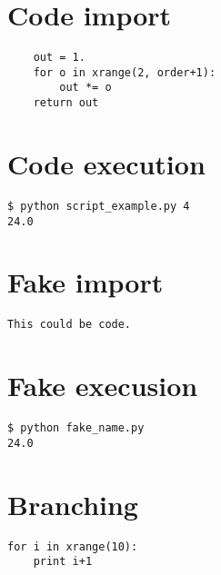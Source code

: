 \documentclass{article}
\begin{document}
\section*{Code import}

\begin{Verbatim}
    out = 1.
    for o in xrange(2, order+1):
        out *= o
    return out
\end{Verbatim}

\section*{Code execution}

\vspace{4pt}
\begin{Verbatim}
$ python script_example.py 4
24.0
\end{Verbatim}
\noindent

\section*{Fake import}

\begin{Verbatim}
This could be code.
\end{Verbatim}

\section*{Fake execusion}

\begin{Verbatim}
$ python fake_name.py
24.0
\end{Verbatim}
\noindent

\section*{Branching}


\begin{Verbatim}
for i in xrange(10):
    print i+1
\end{Verbatim}
\end{document}
